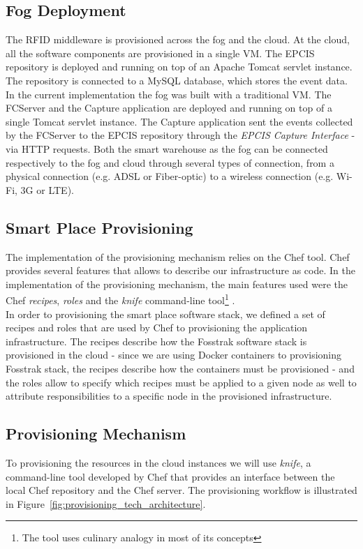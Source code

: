 \subsection{Fog Deployment}
\label{sub:imp_smart_warehouse_fog}
The \gls{RFID} middleware is provisioned across the fog and the cloud. At the cloud,
all the software components are provisioned in a single \gls{VM}. The \gls{EPCIS} repository is deployed
and running on top of an Apache Tomcat servlet instance. The repository is connected to a MySQL
database, which stores the event data. In the current implementation the fog was built with a traditional
\gls{VM}. The \gls{FCServer} and the Capture application are deployed and running on top of a single
Tomcat servlet instance. The Capture application sent the events collected by the \gls{FCServer} to
the \gls{EPCIS} repository through the \textit{\gls{EPCIS} Capture Interface} - via \gls{HTTP} requests.
Both the smart warehouse as the fog can be connected respectively to the fog and cloud through several
types of connection, from a physical connection (e.g. \gls{ADSL} or Fiber-optic) to a wireless connection
(e.g. Wi-Fi, 3G or \gls{LTE}).

\subsection{Smart Place Provisioning}
\label{sec:impl_provisioning}
The implementation of the provisioning mechanism relies on the Chef tool. Chef provides several
features that allows to describe our infrastructure as code. In the implementation of the provisioning
mechanism, the main features used were the Chef \textit{recipes}, \textit{roles} and the \textit{knife}
command-line tool\footnote{The tool uses culinary analogy in most of its concepts} .\\

In order to provisioning the smart place software stack, we defined a set of recipes and roles that
are used by Chef to provisioning the application infrastructure. The recipes describe how the
Fosstrak software stack is provisioned in the cloud - since we are using Docker containers to
provisioning Fosstrak stack, the recipes describe how the containers must be provisioned -
and the roles allow to specify which recipes must be applied to a given node as well to
attribute responsibilities to a specific node in the provisioned infrastructure.

\subsection{Provisioning Mechanism}
\label{subs:provisioning_mechanism}
To provisioning the resources in the cloud instances we will use \textit{knife}, a command-line tool
developed by Chef that provides an interface between the local Chef repository and the Chef server.
The provisioning workflow is illustrated in Figure~\ref{fig:provisioning_tech_architecture}.\\

